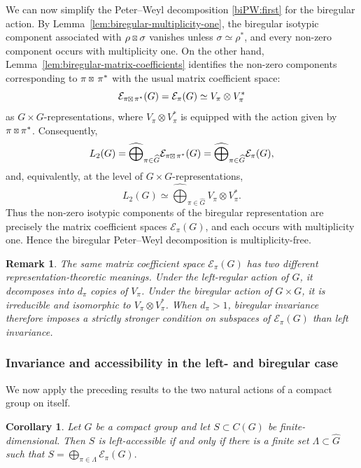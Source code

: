 \documentclass[11pt,showkeys]{amsart}
\newcommand{\sboxtimes}
{\mathbin{\vcenter{\hbox{\scalebox{0.65}{$\boxtimes$}}}}}
\newtheorem{remark}[theorem]{Remark}
\newtheorem{corollary}[theorem]{Corollary}
\begin{document}
We can now simplify the Peter--Weyl decomposition
\eqref{biPW:first} for the biregular action. By
Lemma~\ref{lem:biregular-multiplicity-one}, the biregular isotypic
component associated with \(\rho\sboxtimes\sigma\) vanishes unless
\(\sigma\simeq\rho^*\), and every non-zero component occurs with
multiplicity one. On the other hand,
Lemma~\ref{lem:biregular-matrix-coefficients} identifies the
non-zero components corresponding to \(\pi\sboxtimes\,\pi^*\) with the
usual matrix coefficient space:
\[
    \mathcal E_{\pi\sboxtimes\,\pi^*}(G)
    =
    \mathcal E_\pi(G)
    \simeq
    V_\pi\otimes V_\pi^*
\]
as \(G\times G\)-representations, where \(V_\pi\otimes V_\pi^*\) is
equipped with the action given by $\pi\sboxtimes\pi^*$. Consequently,
\[
    L_2(G)
    =
    \widehat{\bigoplus}_{\pi\in\widehat G}
    \mathcal E_{\pi\sboxtimes\,\pi^*}(G)
    =
    \widehat{\bigoplus}_{\pi\in\widehat G}
    \mathcal E_\pi(G),
\]
and, equivalently, at the level of \(G\times G\)-representations,
\[
    L_2(G)
    \simeq
    \widehat{\bigoplus}_{\pi\in\widehat G}
    V_\pi\otimes V_\pi^*.
\]
Thus the non-zero isotypic components of the biregular representation
are precisely the matrix coefficient spaces
\(\mathcal E_\pi(G)\), and each occurs with multiplicity one. Hence
the biregular Peter--Weyl decomposition is multiplicity-free.



\begin{remark}
\label{rem:left-vs-biregular}
The same matrix coefficient space \(\mathcal E_\pi(G)\) has two different
representation-theoretic meanings. Under the left-regular action of
\(G\), it decomposes into \(d_\pi\) copies of \(V_\pi\). Under the
biregular action of \(G\times G\), it is irreducible and isomorphic to
\(V_\pi\otimes V_\pi^*\). When \(d_\pi>1\), biregular invariance therefore
imposes a strictly stronger condition on subspaces of
\(\mathcal E_\pi(G)\) than left invariance.
\end{remark}




\subsubsection{Invariance and accessibility in the left- and biregular case}
\label{Invariance and accessibility in the left- and biregular case}

We now apply the preceding results to the two natural actions of a
compact group on itself.

\begin{corollary}
\label{cor:left-regular-accessibility}
Let \(G\) be a compact group and let \(S\subset C(G)\) be
finite-dimensional. Then \(S\) is left-accessible
if and only if there is a finite set \(\Lambda\subset\widehat G\) such
that
\(
        S
        =
        \bigoplus_{\pi\in\Lambda}
        \mathcal E_\pi(G).
\)
\end{corollary}
\end{document}
